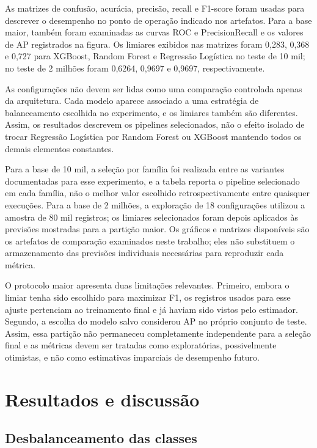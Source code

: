 \documentclass[11pt,a4paper]{article}
\begin{document}
As matrizes de confusão, acurácia, precisão, recall e F1-score foram usadas para descrever o desempenho no ponto de operação indicado nos artefatos. Para a base maior, também foram examinadas as curvas ROC e Precision\textendash{}Recall e os valores de AP registrados na figura. Os limiares exibidos nas matrizes foram 0,283, 0,368 e 0,727 para XGBoost, Random Forest e Regressão Logística no teste de 10 mil; no teste de 2 milhões foram 0,6264, 0,9697 e 0,9697, respectivamente.

As configurações não devem ser lidas como uma comparação controlada apenas da arquitetura. Cada modelo aparece associado a uma estratégia de balanceamento escolhida no experimento, e os limiares também são diferentes. Assim, os resultados descrevem os pipelines selecionados, não o efeito isolado de trocar Regressão Logística por Random Forest ou XGBoost mantendo todos os demais elementos constantes.

Para a base de 10 mil, a seleção por família foi realizada entre as variantes documentadas para esse experimento, e a tabela reporta o pipeline selecionado em cada família, não o melhor valor escolhido retrospectivamente entre quaisquer execuções. Para a base de 2 milhões, a exploração de 18 configurações utilizou a amostra de 80 mil registros; os limiares selecionados foram depois aplicados às previsões mostradas para a partição maior. Os gráficos e matrizes disponíveis são os artefatos de comparação examinados neste trabalho; eles não substituem o armazenamento das previsões individuais necessárias para reproduzir cada métrica.

O protocolo maior apresenta duas limitações relevantes. Primeiro, embora o limiar tenha sido escolhido para maximizar F1, os registros usados para esse ajuste pertenciam ao treinamento final e já haviam sido vistos pelo estimador. Segundo, a escolha do modelo salvo considerou AP no próprio conjunto de teste. Assim, essa partição não permaneceu completamente independente para a seleção final e as métricas devem ser tratadas como exploratórias, possivelmente otimistas, e não como estimativas imparciais de desempenho futuro.

\section{Resultados e discussão}

\subsection{Desbalanceamento das classes}
\end{document}
